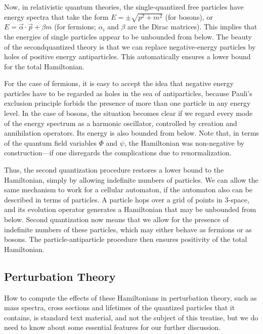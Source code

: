 \documentclass[main.tex]{subfiles}
\begin{document}
Now, in relativistic quantum theories, the single-quantized free particles have energy spectra that take the form $E=\pm \sqrt{p^{2}+m^{2}}$ (for bosons), or $E=\vec{\alpha} \cdot \vec{p}+\beta m$ (for fermions; $\alpha_{i}$ and $\beta$ are the Dirac matrices). This implies that the energies of single particles appear to be unbounded from below. The beauty of the secondquantized theory is that we can replace negative-energy particles by holes of positive energy antiparticles. This automatically ensures a lower bound for the total Hamiltonian.

For the case of fermions, it is easy to accept the idea that negative energy particles have to be regarded as holes in the sea of antiparticles, because Pauli's exclusion principle forbids the presence of more than one particle in any energy level. In the case of bosons, the situation becomes clear if we regard every mode of the energy spectrum as a harmonic oscillator, controlled by creation and annihilation operators.
Its energy is also bounded from below. Note that, in terms of the quantum field variables $\Phi$ and $\psi$, the Hamiltonian was non-negative by construction—if one disregards the complications due to renormalization.

Thus, the second quantization procedure restores a lower bound to the Hamiltonian, simply by allowing indefinite numbers of particles. We can allow the same mechanism to work for a cellular automaton, if the automaton also can be described in terms of particles. A particle hops over a grid of points in 3-space, and its evolution
operator generates a Hamiltonian that may be unbounded from below. Second quantization now means that we allow for the presence of indefinite numbers of these particles, which may either behave as fermions or as bosons. The particle-antiparticle procedure then ensures positivity of the total Hamiltonian.



\subsection{Perturbation Theory}\label{ch20.4}

How to compute the effects of these Hamiltonians in perturbation theory, such as mass spectra, cross sections and lifetimes of the quantized particles that it contains, is standard text material, and not the subject of this treatise, but we do need to know about some essential features for our further discussion.
\end{document}
